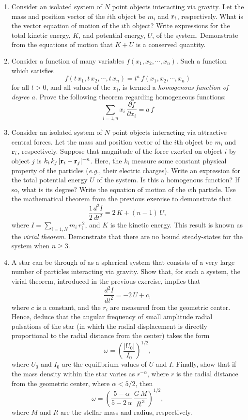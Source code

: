 {\small
\renewcommand{\theenumi}{2.\arabic{enumi}}
\begin{enumerate}
\item Consider an isolated system of $N$ point objects interacting via
gravity. Let the mass and position vector of the $i$th object be
 $m_i$ and  ${\bf r}_i$, respectively. What is  the vector equation
 of motion of the $i$th object? Write expressions for the total
 kinetic energy, $K$, and potential energy, $U$, of the system.
 Demonstrate from the equations of motion  that $K+U$ is a conserved quantity.
 
 \item Consider a function of many variables $f(x_1,x_2,\cdots,x_n)$. 
 Such a function which satisfies
 $$
 f(t\,x_1, t\,x_2,\cdots,t\,x_n) = t^a\,f(x_1,x_2,\cdots,x_n)
 $$
 for all $t>0$, and all values of the $x_i$, is termed a {\em homogenous function of degree $a$}. 
 Prove the following theorem regarding homogeneous functions:
 $$
 \sum_{i=1,n} x_i\,\frac{\partial f}{\partial x_i} = a\,f
 $$
 
  \item Consider an isolated system of $N$ point objects interacting via
attractive central forces. Let the mass and position vector of the $i$th object be
 $m_i$ and  ${\bf r}_i$, respectively. Suppose that magnitude of the force exerted on object $i$ by
object $j$ is $k_i\,k_j\,|{\bf r}_i-{\bf r}_j|^{-n}$. Here, the $k_i$ measure
some constant physical
property of the particles ({\em e.g.}, their electric charges). Write
an expression for the total potential energy $U$ of the system. Is
this a homogenous function? If so, what is its degree?
Write the equation of motion of the $i$th particle. Use the mathematical
theorem from the previous exercise to demonstrate that
$$
\frac{1}{2}\frac{d^2 I}{dt^2} = 2\,K + (n-1)\,U,
$$
where $I=\sum_{i=1,N} m_i\, r_i^{\,2}$, and $K$ is the kinetic energy.
This result is known as the {\em virial theorem}.
Demonstrate that there are no bound steady-states for the system
when $n\geq 3$. 
 
\item A star can be through of as a spherical system that consists of a very large number of particles interacting
via gravity.  Show that, for such a system, the virial theorem, introduced in the previous exercise, implies that
$$
\frac{d^2 I}{dt^2} = -2\,U + c,
$$
where $c$ is a constant, and the $r_i$ are measured from the geometric center. Hence, deduce that the angular frequency of small amplitude radial pulsations
of the star (in which the radial displacement is directly proportional to the radial distance from the center) takes the form
$$
\omega = \left(\frac{|U_0|}{I_0}\right)^{1/2},
$$
where $U_0$ and $I_0$ are the equilibrium values of $U$ and $I$. Finally, show that if the mass
density within the star varies as $r^{-\alpha}$, where $r$ is the radial distance from the geometric center, where $\alpha<5/2$, then
$$
\omega = \left(\frac{5-\alpha}{5-2\,\alpha}\,\frac{G\,M}{R^{\,3}}\right)^{1/2},
$$
where $M$ and $R$ are the stellar mass and radius, respectively.
 

\end{enumerate}}
